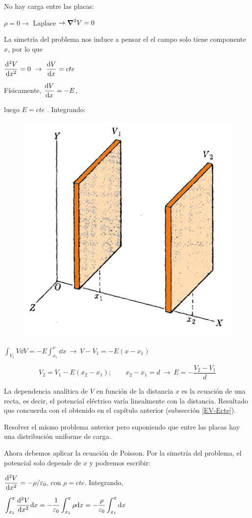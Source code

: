 \begin{multicols}{2}
No hay carga entre las placas: 

$\rho=0 \to $ Laplace $\to \grad^2V=0$

La simetría del problema nos induce a pensar el el campo solo tiene componente $x$, por lo que

$\displaystyle \dv[2]{V}{x}=0 \ \to \ \dv{V}{x}=cte$

Físicamente, $\displaystyle \dv{V}{x}=-E$, 

luego $E=cte$ . Integrando:
\begin{figure}[H]
	\centering
	\includegraphics[width=.5\textwidth]{imagenes/imagenes23/T23IM12.png}
\end{figure}	
\end{multicols}

$\displaystyle \int_{V_1}V \dd V=-E \int_{x_1}^x \dd x \ \to \ V-V_1=-E(x-x_1)$

$$V_2=V_1-E(x_2-x_1); \qquad x_2-x_1=d \ \to \ 	E=-\dfrac {V_2-V_1}{d}$$

La dependencia analítica de $V$ en función de la distancia $x$ es la ecuación de una recta, es decir, el potencial eléctrico varía linealmente con la distancia. Resultado que concuerda con el obtenido en el capítulo anterior (subsección \ref{EV-Ecte}).

\begin{ejem}
Resolver el mismo problema anterior pero suponiendo que entre las placas hay una distribución uniforme de carga.
\end{ejem}

Ahora debemos aplicar la ecuación de Poisson. Por la simetría del problema, el potencial solo depende de $x$ y podremos escribir:

$\displaystyle \dv[2]{V}{x}=-\rho / \varepsilon_0$, con $\rho=cte$. Integrando,

$\displaystyle \int_{x_1}^x \dv[2]{V}{x} \dd x = -\dfrac 1 {\varepsilon_0} \int_{x_1}^x \rho \dd x = -\dfrac \rho {\varepsilon_0} \int_{x_1}^x \dd x$

